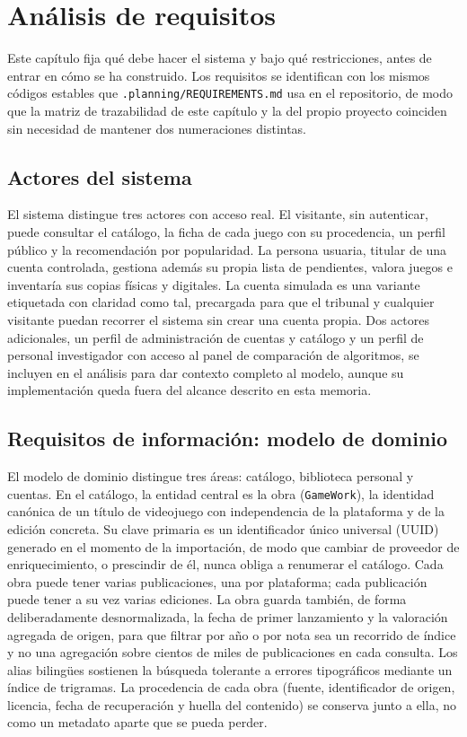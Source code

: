 \chapter{Análisis de requisitos}\label{cap:requisitos}

Este capítulo fija qué debe hacer el sistema y bajo qué restricciones, antes de entrar en cómo
se ha construido. Los requisitos se identifican con los mismos códigos estables que
\texttt{.planning/REQUIREMENTS.md} usa en el repositorio, de modo que la matriz de
trazabilidad de este capítulo y la del propio proyecto coinciden sin necesidad de mantener dos
numeraciones distintas.

\section{Actores del sistema}\label{sec:req-actores}

El sistema distingue tres actores con acceso real. El visitante, sin autenticar, puede
consultar el catálogo, la ficha de cada juego con su procedencia, un perfil público y la
recomendación por popularidad. La persona usuaria, titular de una cuenta controlada, gestiona
además su propia lista de pendientes, valora juegos e inventaría sus copias físicas y
digitales. La cuenta simulada es una variante etiquetada con claridad como tal, precargada
para que el tribunal y cualquier visitante puedan recorrer el sistema sin crear una cuenta
propia. Dos actores adicionales, un perfil de administración de cuentas y catálogo y un perfil
de personal investigador con acceso al panel de comparación de algoritmos, se incluyen en el
análisis para dar contexto completo al modelo, aunque su implementación queda fuera del
alcance descrito en esta memoria.

\section{Requisitos de información: modelo de dominio}\label{sec:req-informacion}

El modelo de dominio distingue tres áreas: catálogo, biblioteca personal y cuentas. En el
catálogo, la entidad central es la obra (\texttt{GameWork}), la identidad canónica de un
título de videojuego con independencia de la plataforma y de la edición concreta. Su clave
primaria es un identificador único universal (UUID) generado en el momento de la importación,
de modo que cambiar de proveedor de enriquecimiento, o prescindir de él, nunca obliga a
renumerar el catálogo. Cada obra puede tener varias publicaciones, una por plataforma; cada
publicación puede tener a su vez varias ediciones. La obra guarda también, de forma
deliberadamente desnormalizada, la fecha de primer lanzamiento y la valoración agregada de
origen, para que filtrar por año o por nota sea un recorrido de índice y no una agregación
sobre cientos de miles de publicaciones en cada consulta. Los alias bilingües sostienen la
búsqueda tolerante a errores tipográficos mediante un índice de trigramas. La procedencia de
cada obra (fuente, identificador de origen, licencia, fecha de recuperación y huella del
contenido) se conserva junto a ella, no como un metadato aparte que se pueda perder.

